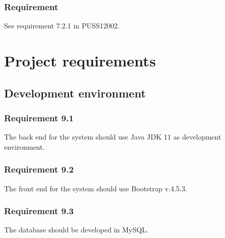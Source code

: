 \documentclass{article}
\begin{document}
\subsubsection{Requirement}
See requirement 7.2.1 in PUSS12002.




\section{Project requirements}
\subsection{Development environment}
\subsubsection{Requirement 9.1}
The back end for the system should use Java JDK 11 as development environment.

\subsubsection{Requirement 9.2}
The front end for the system should use Bootstrap v.4.5.3.

\subsubsection{Requirement 9.3}
The database should be developed in MySQL.
\end{document}
